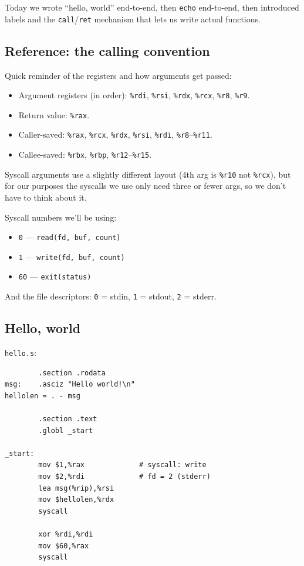 \documentclass[11pt]{article}
\begin{document}
Today we wrote ``hello, world'' end-to-end, then \texttt{echo}
end-to-end, then introduced labels and the \texttt{call}/\texttt{ret}
mechanism that lets us write actual functions.

\subsection*{Reference: the calling convention}

Quick reminder of the registers and how arguments get passed:
\begin{itemize}
  \item Argument registers (in order): \texttt{\%rdi}, \texttt{\%rsi},
    \texttt{\%rdx}, \texttt{\%rcx}, \texttt{\%r8}, \texttt{\%r9}.
  \item Return value: \texttt{\%rax}.
  \item Caller-saved: \texttt{\%rax}, \texttt{\%rcx}, \texttt{\%rdx},
    \texttt{\%rsi}, \texttt{\%rdi}, \texttt{\%r8}--\texttt{\%r11}.
  \item Callee-saved: \texttt{\%rbx}, \texttt{\%rbp},
    \texttt{\%r12}--\texttt{\%r15}.
\end{itemize}
Syscall arguments use a slightly different layout (4th arg is
\texttt{\%r10} not \texttt{\%rcx}), but for our purposes the syscalls
we use only need three or fewer args, so we don't have to think
about it.

Syscall numbers we'll be using:
\begin{itemize}
  \item \texttt{0} --- \texttt{read(fd, buf, count)}
  \item \texttt{1} --- \texttt{write(fd, buf, count)}
  \item \texttt{60} --- \texttt{exit(status)}
\end{itemize}
And the file descriptors: \texttt{0} = stdin, \texttt{1} = stdout,
\texttt{2} = stderr.

\subsection*{Hello, world}

\texttt{hello.s}:

\begin{lstlisting}
        .section .rodata
msg:    .asciz "Hello world!\n"
hellolen = . - msg

        .section .text
        .globl _start

_start:
        mov $1,%rax             # syscall: write
        mov $2,%rdi             # fd = 2 (stderr)
        lea msg(%rip),%rsi
        mov $hellolen,%rdx
        syscall

        xor %rdi,%rdi
        mov $60,%rax
        syscall
\end{lstlisting}
\end{document}
